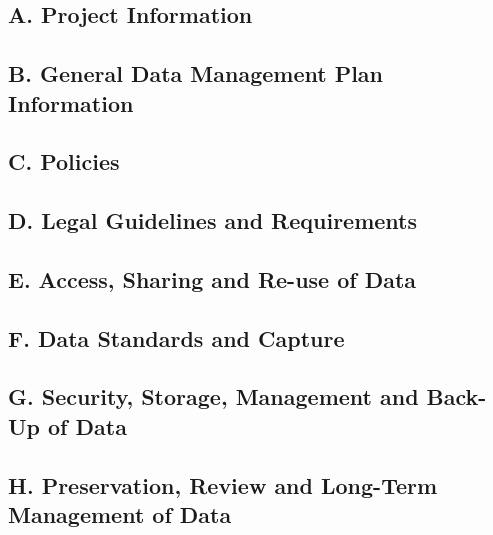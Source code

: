 


\subsection*{A. Project Information}


\subsection*{B. General Data Management Plan Information }

\subsection*{C. Policies }

\subsection*{D. Legal Guidelines and Requirements }

\subsection*{E. Access, Sharing and Re-use of Data }



\subsection*{F. Data Standards and Capture }


\subsection*{G. Security, Storage, Management and Back-Up of Data }


\subsection*{H. Preservation, Review and Long-Term Management of Data }








